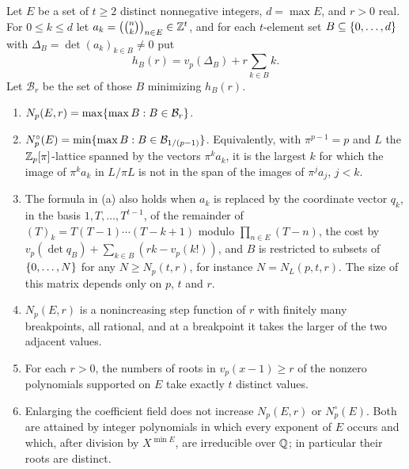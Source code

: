\begin{theorem}\label{smd:thm:minbasis}
Let $E$ be a set of $t\ge2$ distinct nonnegative integers, $d=\max E$, and $r>0$ real. For
$0\le k\le d$ let $a_k=\bigl(\binom nk\bigr)_{n\in E}\in\mathbb{Z}^t$, and for each $t$-element set
$B\subseteq\{0,\dots,d\}$ with $\Delta_B=\det(a_k)_{k\in B}\ne0$ put
\[
 h_B(r)=v_p(\Delta_B)+r\sum_{k\in B}k .
\]
Let $\mathcal B_r$ be the set of those $B$ minimizing $h_B(r)$.
\begin{enumerate}[label=\textup{(\alph*)}]
\item $N_p(E,r)=\max\{\max B : B\in\mathcal B_r\}$.
\item $N^\circ_p(E)=\min\{\max B : B\in\mathcal B_{1/(p-1)}\}$. Equivalently, with
$\pi^{p-1}=p$ and $L$ the $\mathbb{Z}_p[\pi]$-lattice spanned by the vectors $\pi^ka_k$, it is the
largest $k$ for which the image of $\pi^ka_k$ in $L/\pi L$ is not in the span of the images of
$\pi^ja_j$, $j<k$.
\item The formula in (a) also holds when $a_k$ is replaced by the coordinate vector $q_k$, in the
basis $1,T,\dots,T^{t-1}$, of the remainder of $(T)_k=T(T-1)\cdots(T-k+1)$ modulo
$\prod_{n\in E}(T-n)$, the cost by $v_p(\det q_B)+\sum_{k\in B}(rk-v_p(k!))$, and $B$ is
restricted to subsets of $\{0,\dots,N\}$ for any $N\ge N_p(t,r)$, for instance
$N=N_L(p,t,r)$. The size of this matrix depends only on $p$, $t$ and $r$.
\item $N_p(E,r)$ is a nonincreasing step function of $r$ with finitely many breakpoints, all
rational, and at a breakpoint it takes the larger of the two adjacent values.
\item For each $r>0$, the numbers of roots in $v_p(x-1)\ge r$ of the nonzero polynomials
supported on $E$ take exactly $t$ distinct values.
\item Enlarging the coefficient field does not increase $N_p(E,r)$ or $N^\circ_p(E)$. Both are
attained by integer polynomials in which every exponent of $E$ occurs and which, after division
by $X^{\min E}$, are irreducible over $\mathbb{Q}$; in particular their roots are distinct.
\end{enumerate}
\end{theorem}

